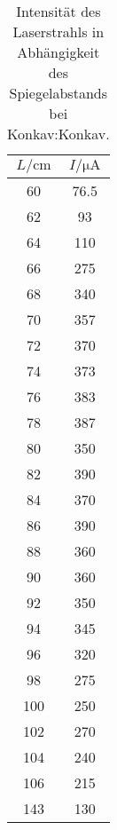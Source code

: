 \begin{table}
    \centering
    \caption{Intensität des Laserstrahls in Abhängigkeit des Spiegelabstands bei Konkav:Konkav.}
    \label{tab:kon_kon_data}
    \begin{tabular}{c c}
        \toprule
        $L/\si{\centi\meter}$ & $I/\si{\micro\ampere} $ \\
        \midrule
        60 & 76.5\\
        62 & 93\\
        64 & 110\\
        66 & 275\\
        68 & 340\\
        70 & 357\\
        72 & 370\\
        74 & 373\\
        76 & 383\\
        78 & 387\\
        80 & 350\\
        82 & 390\\
        84 & 370\\
        86 & 390\\
        88 & 360\\
        90 & 360\\
        92 & 350\\
        94 & 345\\
        96 & 320\\
        98 & 275\\
        100& 250\\
        102& 270\\
        104& 240\\
        106& 215\\
        143& 130\\
        \bottomrule
    \end{tabular}
\end{table}

